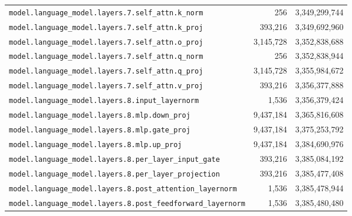 \documentclass[10pt,a4paper]{article}
\theoremstyle{definition}
\begin{document}
\begin{appendices}
\begin{longtable}{p{9.5cm}rr}
\texttt{model.\allowbreak{}language\_model.\allowbreak{}layers.\allowbreak{}7.\allowbreak{}self\_attn.\allowbreak{}k\_norm} & 256 & 3,349,299,744 \\
\texttt{model.\allowbreak{}language\_model.\allowbreak{}layers.\allowbreak{}7.\allowbreak{}self\_attn.\allowbreak{}k\_proj} & 393,216 & 3,349,692,960 \\
\texttt{model.\allowbreak{}language\_model.\allowbreak{}layers.\allowbreak{}7.\allowbreak{}self\_attn.\allowbreak{}o\_proj} & 3,145,728 & 3,352,838,688 \\
\texttt{model.\allowbreak{}language\_model.\allowbreak{}layers.\allowbreak{}7.\allowbreak{}self\_attn.\allowbreak{}q\_norm} & 256 & 3,352,838,944 \\
\texttt{model.\allowbreak{}language\_model.\allowbreak{}layers.\allowbreak{}7.\allowbreak{}self\_attn.\allowbreak{}q\_proj} & 3,145,728 & 3,355,984,672 \\
\texttt{model.\allowbreak{}language\_model.\allowbreak{}layers.\allowbreak{}7.\allowbreak{}self\_attn.\allowbreak{}v\_proj} & 393,216 & 3,356,377,888 \\
\texttt{model.\allowbreak{}language\_model.\allowbreak{}layers.\allowbreak{}8.\allowbreak{}input\_layernorm} & 1,536 & 3,356,379,424 \\
\texttt{model.\allowbreak{}language\_model.\allowbreak{}layers.\allowbreak{}8.\allowbreak{}mlp.\allowbreak{}down\_proj} & 9,437,184 & 3,365,816,608 \\
\texttt{model.\allowbreak{}language\_model.\allowbreak{}layers.\allowbreak{}8.\allowbreak{}mlp.\allowbreak{}gate\_proj} & 9,437,184 & 3,375,253,792 \\
\texttt{model.\allowbreak{}language\_model.\allowbreak{}layers.\allowbreak{}8.\allowbreak{}mlp.\allowbreak{}up\_proj} & 9,437,184 & 3,384,690,976 \\
\texttt{model.\allowbreak{}language\_model.\allowbreak{}layers.\allowbreak{}8.\allowbreak{}per\_layer\_input\_gate} & 393,216 & 3,385,084,192 \\
\texttt{model.\allowbreak{}language\_model.\allowbreak{}layers.\allowbreak{}8.\allowbreak{}per\_layer\_projection} & 393,216 & 3,385,477,408 \\
\texttt{model.\allowbreak{}language\_model.\allowbreak{}layers.\allowbreak{}8.\allowbreak{}post\_attention\_layernorm} & 1,536 & 3,385,478,944 \\
\texttt{model.\allowbreak{}language\_model.\allowbreak{}layers.\allowbreak{}8.\allowbreak{}post\_feedforward\_layernorm} & 1,536 & 3,385,480,480 \\

\end{longtable}
\end{appendices}
\end{document}
